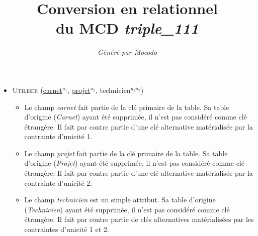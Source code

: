\documentclass[a4paper]{article}
\title{Conversion en relationnel\\du MCD \emph{triple_111}}
\author{\emph{Généré par Mocodo}}
\newcommand{\relat}[1]{\textsc{#1}}
\newcommand{\attr}[1]{#1}
\newcommand{\prim}[1]{\uline{#1}}
\begin{document}
\maketitle

\begin{itemize}
  \item \relat{Utiliser} (\prim{carnet}$^{u_1}$, \prim{projet}$^{u_2}$, \attr{technicien}$^{u_1 u_2}$)
  \begin{itemize}
    \item Le champ \emph{carnet} fait partie de la clé primaire de la table. Sa table d'origine (\emph{Carnet}) ayant été supprimée, il n'est pas considéré comme clé étrangère. Il fait par contre partie d'une clé alternative matérialisée par la contrainte d'unicité 1.
    \item Le champ \emph{projet} fait partie de la clé primaire de la table. Sa table d'origine (\emph{Projet}) ayant été supprimée, il n'est pas considéré comme clé étrangère. Il fait par contre partie d'une clé alternative matérialisée par la contrainte d'unicité 2.
    \item Le champ \emph{technicien} est un simple attribut. Sa table d'origine (\emph{Technicien}) ayant été supprimée, il n'est pas considéré comme clé étrangère. Il fait par contre partie de clés alternatives matérialisées par les contraintes d'unicité 1 et 2.
  \end{itemize}

\end{itemize}
\end{document}
